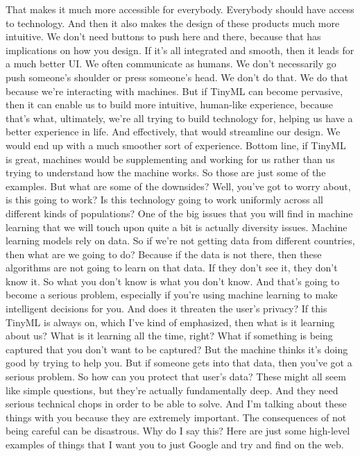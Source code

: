 That makes it much more accessible for everybody.
Everybody should have access to technology.
And then it also makes the design of these products much more intuitive.
We don't need buttons to push here and there, because that has implications on how you design.
If it's all integrated and smooth, then it leads for a much better UI.
We often communicate as humans.
We don't necessarily go push someone's shoulder or press someone's head.
We don't do that.
We do that because we're interacting with machines.
But if TinyML can become pervasive, then it can enable us to build more intuitive, human-like experience, because that's what, ultimately, we're all trying to build technology for, helping us have a better experience in life.
And effectively, that would streamline our design.
We would end up with a much smoother sort of experience.
Bottom line, if TinyML is great, machines would be supplementing and working for us rather than us trying to understand how the machine works.
So those are just some of the examples.
But what are some of the downsides?
Well, you've got to worry about, is this going to work?
Is this technology going to work uniformly across all different kinds of populations?
One of the big issues that you will find in machine learning that we will touch upon quite a bit is actually diversity issues.
Machine learning models rely on data.
So if we're not getting data from different countries, then what are we going to do?
Because if the data is not there, then these algorithms are not going to learn on that data.
If they don't see it, they don't know it.
So what you don't know is what you don't know.
And that's going to become a serious problem, especially
if you're using machine learning to make intelligent decisions for you.
And does it threaten the user's privacy?
If this TinyML is always on, which I've kind of emphasized, then
what is it learning about us?
What is it learning all the time, right?
What if something is being captured that you don't want to be captured?
But the machine thinks it's doing good by trying to help you.
But if someone gets into that data, then you've got a serious problem.
So how can you protect that user's data?
These might all seem like simple questions,
but they're actually fundamentally deep.
And they need serious technical chops in order to be able to solve.
And I'm talking about these things with you
because they are extremely important.
The consequences of not being careful can be disastrous.
Why do I say this?
Here are just some high-level examples of things
that I want you to just Google and try and find on the web.
